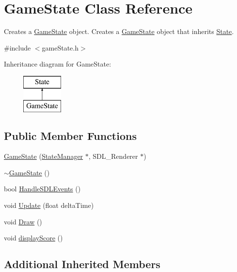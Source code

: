 \hypertarget{class_game_state}{\section{Game\+State Class Reference}
\label{class_game_state}
}


Creates a \hyperlink{class_game_state}{Game\+State} object. Creates a \hyperlink{class_game_state}{Game\+State} object that inherits \hyperlink{class_state}{State}.  




{\ttfamily \#include $<$game\+State.\+h$>$}

Inheritance diagram for Game\+State\+:\begin{figure}[H]
\begin{center}
\leavevmode
\includegraphics[height=2.000000cm]{class_game_state}
\end{center}
\end{figure}
\subsection*{Public Member Functions}
\begin{DoxyCompactItemize}
\item 
\hyperlink{class_game_state_a0e812c09d724c03147ad6721b4d7bd73}{Game\+State} (\hyperlink{class_state_manager}{State\+Manager} $\ast$, S\+D\+L\+\_\+\+Renderer $\ast$)
\item 
\hyperlink{class_game_state_ae623df5042cd0c17daa3394fdcb397b3}{$\sim$\+Game\+State} ()
\item 
bool \hyperlink{class_game_state_a5e2467775e9a941d482e0489295c363d}{Handle\+S\+D\+L\+Events} ()
\item 
void \hyperlink{class_game_state_a2ea32b0cd5f747ef6223d182f415a6c4}{Update} (float delta\+Time)
\item 
void \hyperlink{class_game_state_ab9330b36c7c74d733c2739c025285c64}{Draw} ()
\item 
void \hyperlink{class_game_state_af45ac6c893265a41b011bba850dc840a}{display\+Score} ()
\end{DoxyCompactItemize}
\subsection*{Additional Inherited Members}


